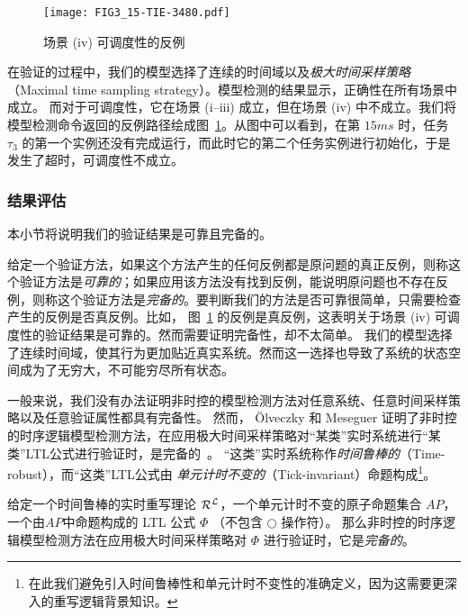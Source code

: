 \begin{landscape}
\begin{figure} 
\centering 
\texttt{[image: FIG3\_15-TIE-3480.pdf]}
\caption{场景 (iv) 可调度性的反例}
\label{f:counterexample}
\end{figure}
\end{landscape}

在验证的过程中，我们的模型选择了连续的时间域以及\emph{极大时间采样策略}（Maximal time sampling strategy）。模型检测的结果显示，正确性在所有场景中成立。
而对于可调度性，它在场景 (i--iii) 成立，但在场景 (iv) 中不成立。我们将模型检测命令返回的反例路径绘成图~\ref{f:counterexample}。从图中可以看到，在第 $15ms$ 时，任务 $\tau_3$ 的第一个实例还没有完成运行，而此时它的第二个任务实例进行初始化，于是发生了超时，可调度性不成立。


\subsubsection{结果评估}
本小节将说明我们的验证结果是可靠且完备的。

给定一个验证方法，如果这个方法产生的任何反例都是原问题的真正反例，则称这个验证方法是\emph{可靠的}；如果应用该方法没有找到反例，能说明原问题也不存在反例，则称这个验证方法是\emph{完备的}。要判断我们的方法是否可靠很简单，只需要检查产生的反例是否真反例。比如，
图~\ref{f:counterexample} 的反例是真反例，这表明关于场景 (iv) 可调度性的验证结果是可靠的。然而需要证明完备性，却不太简单。
我们的模型选择了连续时间域，使其行为更加贴近真实系统。然而这一选择也导致了系统的状态空间成为了无穷大，不可能穷尽所有状态。

一般来说，我们没有办法证明非时控的模型检测方法对任意系统、任意时间采样策略以及任意验证属性都具有完备性。
然而， \"Olveczky 和 Meseguer 证明了非时控的时序逻辑模型检测方法，在应用极大时间采样策略对“某类”实时系统进行“某类”LTL公式进行验证时，是完备的~\cite{DBLP:journals/entcs/OlveczkyM07a}。
“这类”实时系统称作\emph{时间鲁棒的}（Time-robust），而“这类”LTL公式由
\emph{单元计时不变的}（Tick-invariant）命题构成\footnote{在此我们避免引入时间鲁棒性和单元计时不变性的准确定义，因为这需要更深入的重写逻辑背景知识。}。
\begin{theorem}
\label{t:completeness}
给定一个时间鲁棒的实时重写理论 $\mathcal{R}^{\mathcal{L}}$，一个单元计时不变的原子命题集合 $AP$，一个由$AP$中命题构成的 LTL 公式 $\Phi$ （不包含 $\bigcirc$ 操作符）。
那么非时控的时序逻辑模型检测方法在应用极大时间采样策略对 $\Phi$ 进行验证时，它是\emph{完备的}。
\end{theorem}

